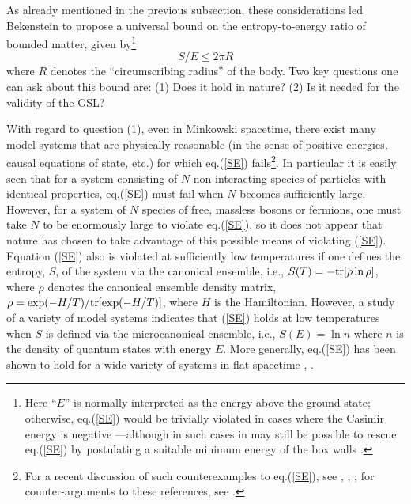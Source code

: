 \documentclass[12pt]{article}
\begin{document}
As already mentioned in the previous subsection, these considerations
led Bekenstein \cite {b3} to propose a universal bound on the
entropy-to-energy ratio of bounded matter, given by\footnote{Here
``$E$'' is normally interpreted as the energy above the ground state;
otherwise, eq.(\ref{SE}) would be trivially violated in cases where
the Casimir energy is negative \cite{page3}---although in such cases in
may still be possible to rescue eq.(\ref{SE}) by postulating a
suitable minimum energy of the box walls \cite{beke}.}
\begin{equation}
S/E \leq 2\pi R
\label{SE}
\end{equation}
where $R$ denotes the ``circumscribing radius'' of the body. Two key
questions one can ask about this bound are: (1) Does it hold in
nature? (2) Is it needed for the validity of the GSL?

With regard to question (1), even in Minkowski spacetime, there exist
many model systems that are physically reasonable (in the sense of
positive energies, causal equations of state, etc.) for which
eq.(\ref{SE}) fails\footnote{For a recent discussion of such
counterexamples to eq.(\ref{SE}), see \cite{page1}, \cite{page2},
\cite{page3}; for counter-arguments to these references, see
\cite{beke}.}. In particular it is easily seen that for a system
consisting of $N$ non-interacting species of particles with identical
properties, eq.(\ref{SE}) must fail when $N$ becomes sufficiently
large. However, for a system of $N$ species of free, massless bosons
or fermions, one must take $N$ to be enormously large \cite{b4} to
violate eq.(\ref{SE}), so it does not appear that nature has chosen to
take advantage of this possible means of violating (\ref{SE}).
Equation (\ref{SE}) also is violated at sufficiently low temperatures
if one defines the entropy, $S$, of the system via the canonical
ensemble, i.e., $S(T) = - {\rm tr} [\rho \ln \rho]$, where $\rho$
denotes the canonical ensemble density matrix, $\rho = \exp(-H/T)/
{\rm tr} [\exp(- H/T)]$, where $H$ is the Hamiltonian. However, a
study of a variety of model systems \cite{b4} indicates that
(\ref{SE}) holds at low temperatures when $S$ is defined via the
microcanonical ensemble, i.e., $S(E) = \ln n$ where $n$ is the density
of quantum states with energy $E$. More generally, eq.(\ref{SE}) has
been shown to hold for a wide variety of systems in flat spacetime
\cite{b4}, \cite{bs}.
\end{document}
